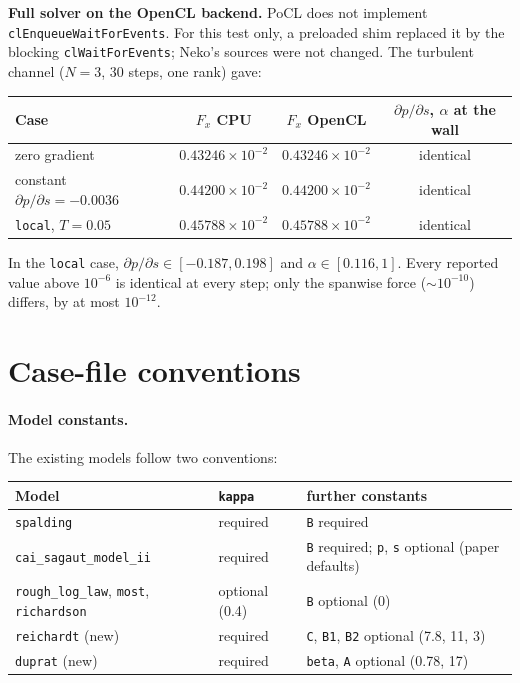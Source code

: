 \documentclass[11pt,a4paper]{article}
\newcommand{\code}[1]{\texttt{#1}}
\newcommand{\dpds}{\partial p/\partial s}
\begin{document}
\noindent \textbf{Full solver on the OpenCL backend.} PoCL does not
implement \code{clEnqueueWaitForEvents}. For this test only, a preloaded
shim replaced it by the blocking \code{clWaitForEvents}; Neko's sources
were not changed. The turbulent channel ($N=3$, 30 steps, one rank) gave:
\begin{center}
\small
\begin{tabular}{lccc}
\toprule
Case & $F_x$ CPU & $F_x$ OpenCL & $\dpds$, $\alpha$ at the wall \\
\midrule
zero gradient & $0.43246\times10^{-2}$ & $0.43246\times10^{-2}$ & identical \\
constant $\dpds = -0.0036$ & $0.44200\times10^{-2}$ & $0.44200\times10^{-2}$ & identical \\
\code{local}, $T = 0.05$ & $0.45788\times10^{-2}$ & $0.45788\times10^{-2}$ & identical \\
\bottomrule
\end{tabular}
\end{center}
In the \code{local} case, $\dpds\in[-0.187, 0.198]$ and
$\alpha\in[0.116, 1]$. Every reported value above $10^{-6}$ is identical at
every step; only the spanwise force ($\sim10^{-10}$) differs, by at most
$10^{-12}$.

\section{Case-file conventions}
\label{sec:conventions}

\paragraph{Model constants.} The existing models follow two conventions:

\begin{center}
\small
\begin{tabular}{lll}
\toprule
Model & \code{kappa} & further constants \\
\midrule
\code{spalding} & required & \code{B} required \\
\code{cai\_sagaut\_model\_ii} & required & \code{B} required; \code{p}, \code{s} optional (paper defaults) \\
\code{rough\_log\_law}, \code{most}, \code{richardson} & optional (0.4) & \code{B} optional (0) \\
\code{reichardt} (new) & required & \code{C}, \code{B1}, \code{B2} optional (7.8, 11, 3) \\
\code{duprat} (new) & required & \code{beta}, \code{A} optional (0.78, 17) \\
\bottomrule
\end{tabular}
\end{center}
\end{document}
